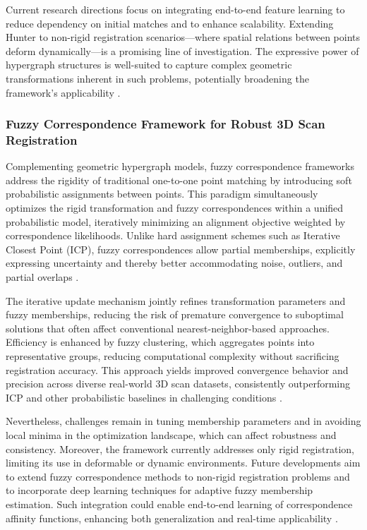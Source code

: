 \documentclass[sigconf]{acmart}
\begin{document}
Current research directions focus on integrating end-to-end feature learning to reduce dependency on initial matches and to enhance scalability. Extending Hunter to non-rigid registration scenarios—where spatial relations between points deform dynamically—is a promising line of investigation. The expressive power of hypergraph structures is well-suited to capture complex geometric transformations inherent in such problems, potentially broadening the framework’s applicability \cite{ref6}.

\subsubsection{Fuzzy Correspondence Framework for Robust 3D Scan Registration}

Complementing geometric hypergraph models, fuzzy correspondence frameworks address the rigidity of traditional one-to-one point matching by introducing soft probabilistic assignments between points. This paradigm simultaneously optimizes the rigid transformation and fuzzy correspondences within a unified probabilistic model, iteratively minimizing an alignment objective weighted by correspondence likelihoods. Unlike hard assignment schemes such as Iterative Closest Point (ICP), fuzzy correspondences allow partial memberships, explicitly expressing uncertainty and thereby better accommodating noise, outliers, and partial overlaps \cite{ref5}.

The iterative update mechanism jointly refines transformation parameters and fuzzy memberships, reducing the risk of premature convergence to suboptimal solutions that often affect conventional nearest-neighbor-based approaches. Efficiency is enhanced by fuzzy clustering, which aggregates points into representative groups, reducing computational complexity without sacrificing registration accuracy. This approach yields improved convergence behavior and precision across diverse real-world 3D scan datasets, consistently outperforming ICP and other probabilistic baselines in challenging conditions \cite{ref5}.

Nevertheless, challenges remain in tuning membership parameters and in avoiding local minima in the optimization landscape, which can affect robustness and consistency. Moreover, the framework currently addresses only rigid registration, limiting its use in deformable or dynamic environments. Future developments aim to extend fuzzy correspondence methods to non-rigid registration problems and to incorporate deep learning techniques for adaptive fuzzy membership estimation. Such integration could enable end-to-end learning of correspondence affinity functions, enhancing both generalization and real-time applicability \cite{ref5}.
\end{document}
